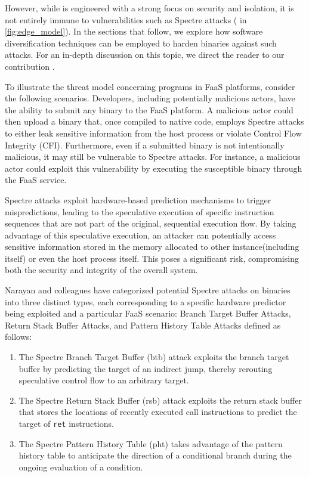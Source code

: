 However, while \Wasm is engineered with a strong focus on security and isolation, it is not entirely immune to vulnerabilities such as Spectre attacks \cite{Spectre,Narayan2021Swivel} ( in \autoref{fig:edge_model}). 
In the sections that follow, we explore how software diversification techniques can be employed to harden \Wasm binaries against such attacks. For an in-depth discussion on this topic, we direct the reader to our contribution \cite{wasmmutate}.


To illustrate the threat model concerning \Wasm programs in FaaS platforms, consider the following scenarios. 
Developers, including potentially malicious actors, have the ability to submit any \Wasm binary to the FaaS platform. 
A malicious actor could then upload a \Wasm binary that, once compiled to native code, employs Spectre attacks to either leak sensitive information from the host process or violate Control Flow Integrity (CFI).
Furthermore, even if a submitted \Wasm binary is not intentionally malicious, it may still be vulnerable to Spectre attacks. 
For instance, a malicious actor could exploit this vulnerability by executing the susceptible binary through the FaaS service. 

Spectre attacks exploit hardware-based prediction mechanisms to trigger mispredictions, leading to the speculative execution of specific instruction sequences that are not part of the original, sequential execution flow. 
By taking advantage of this speculative execution, an attacker can potentially access sensitive information stored in the memory allocated to other \Wasm instance(including itself) or even the host process itself. 
This poses a significant risk, compromising both the security and integrity of the overall system.

Narayan and colleagues \cite{Narayan2021Swivel} have categorized potential Spectre attacks on \wasm binaries into three distinct types, each corresponding to a specific hardware predictor being exploited and a particular FaaS scenario: Branch Target Buffer Attacks,  Return Stack Buffer Attacks, and Pattern History Table Attacks defined as follows:

\begin{enumerate}
    \item The Spectre Branch Target Buffer (btb) attack exploits the branch target buffer by predicting the target of an indirect jump, thereby rerouting speculative control flow to an arbitrary target.
    \item  The Spectre Return Stack Buffer (rsb) attack exploits the return stack buffer that stores the locations of recently executed call instructions to predict the target of \texttt{ret} instructions.
    \item The Spectre Pattern History Table (pht) takes advantage of the pattern history table to anticipate the direction of a conditional branch during the ongoing evaluation of a condition.
\end{enumerate}


